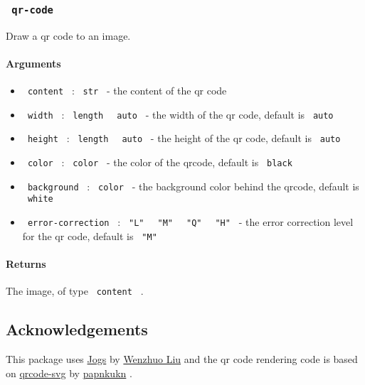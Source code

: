\subsubsection{\texorpdfstring{\texttt{\ qr-code\ }}{ qr-code }}\label{qr-code}

Draw a qr code to an image.

\paragraph{Arguments}\label{arguments}

\begin{itemize}
\tightlist
\item
  \texttt{\ content\ } : \texttt{\ str\ } - the content of the qr code
\item
  \texttt{\ width\ } : \texttt{\ length\ } \textbar{} \texttt{\ auto\ }
  - the width of the qr code, default is \texttt{\ auto\ }
\item
  \texttt{\ height\ } : \texttt{\ length\ } \textbar{} \texttt{\ auto\ }
  - the height of the qr code, default is \texttt{\ auto\ }
\item
  \texttt{\ color\ } : \texttt{\ color\ } - the color of the qrcode,
  default is \texttt{\ black\ }
\item
  \texttt{\ background\ } : \texttt{\ color\ } - the background color
  behind the qrcode, default is \texttt{\ white\ }
\item
  \texttt{\ error-correction\ } : \texttt{\ "L"\ } \textbar{}
  \texttt{\ "M"\ } \textbar{} \texttt{\ "Q"\ } \textbar{}
  \texttt{\ "H"\ } - the error correction level for the qr code, default
  is \texttt{\ "M"\ }
\end{itemize}

\paragraph{Returns}\label{returns}

The image, of type \texttt{\ content\ } .

\subsection{Acknowledgements}\label{acknowledgements}

This package uses \href{https://github.com/Enter-tainer/jogs}{Jogs} by
\href{https://github.com/Enter-tainer}{Wenzhuo Liu} and the qr code
rendering code is based on
\href{https://github.com/papnkukn/qrcode-svg/}{qrcode-svg} by
\href{https://github.com/papnkukn}{papnkukn} .

